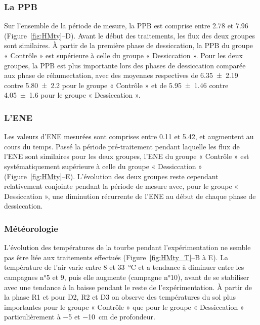 \subsubsection{La PPB}

Sur l'ensemble de la période de mesure, la PPB est comprise entre \num{2.78} et \SI{7.96}{\uml} (Figure~\ref{fig:HMty}--D).
Avant le début des traitements, les flux des deux groupes sont similaires.
À partir de la première phase de dessiccation, la PPB du groupe « Contrôle » est supérieure à celle du groupe « Dessiccation ».
Pour les deux groupes, la PPB est plus importante lors des phases de dessiccation comparée aux phase de réhumectation, avec des moyennes respectives de \num{6.35(219)} contre \num{5.80(220)} pour le groupe « Contrôle » et de \num{5.95(146)} contre \SI{4.05(160)}{\uml} pour le groupe « Dessiccation ».

\subsubsection{L'ENE}

Les valeurs d'ENE mesurées sont comprises entre \num{0.11} et \SI{5.42}{\uml}, et augmentent au cours du temps.
Passé la période pré-traitement pendant laquelle les flux de l'ENE sont similaires pour les deux groupes, l'ENE du groupe « Contrôle » est systématiquement supérieure à celle du groupe « Dessiccation » (Figure~\ref{fig:HMty}--E).
L'évolution des deux groupes reste cependant relativement conjointe pendant la période de mesure avec, pour le groupe « Dessiccation », une diminution récurrente de l'ENE au début de chaque phase de dessiccation.

\subsubsection{Météorologie}

L'évolution des températures de la tourbe pendant l'expérimentation ne semble pas être liée aux traitements effectués (Figure~\ref{fig:HMty_T}--B à E).
La température de l'air varie entre 8 et \SI{33}{\degreeCelsius} et a tendance à diminuer entre les campagnes n°5 et 9, puis elle augmente (campagne n°10), avant de se stabiliser avec une tendance à la baisse pendant le reste de l'expérimentation.
À partir de la phase R1 et pour D2, R2 et D3 on observe des températures du sol plus importantes pour le groupe  « Contrôle » que pour le groupe « Dessiccation » particulièrement à \num{-5} et \SI{-10}{\centi\metre} de profondeur.



